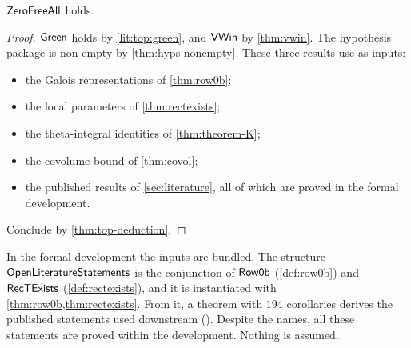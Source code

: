 \begin{theorem}\label{thm:zerofreeall}
$\mathsf{ZeroFreeAll}$ holds. 
\end{theorem}

\begin{proof}
$\mathsf{Green}$ holds by \cref{lit:top:green}, and $\mathsf{VWin}$ by \cref{thm:vwin}. The
hypothesis package is non-empty by \cref{thm:hyps-nonempty}. These three results use as inputs:
\begin{itemize}
\item the Galois representations of \cref{thm:row0b};
\item the local parameters of \cref{thm:rectexists};
\item the theta-integral identities of \cref{thm:theorem-K};
\item the covolume bound of \cref{thm:covol};
\item the published results of \cref{sec:literature}, all of which are proved in the formal development.
\end{itemize}
Conclude by \cref{thm:top-deduction}.
\end{proof}

\begin{remark}\label{rem:top:assembly}
In the formal development the inputs are bundled. The structure $\mathsf{OpenLiteratureStatements}$
is the conjunction of $\mathsf{Row0b}$ (\cref{def:row0b}) and $\mathsf{RecTExists}$
(\cref{def:rectexists}), and it is instantiated with \cref{thm:row0b,thm:rectexists}. From it, a
theorem with $194$ corollaries derives the published statements used downstream
(). Despite the names,
all these statements are proved within the development. Nothing is assumed.
\end{remark}
